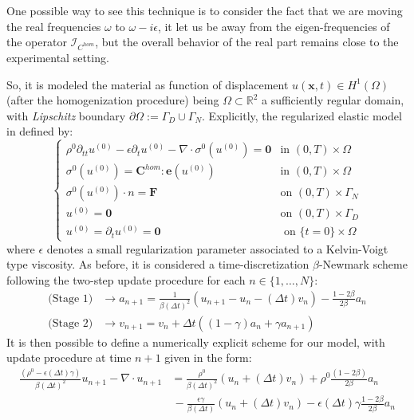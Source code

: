 \begin{rem}
One possible way to see this technique is to consider the fact that we are moving the real frequencies $\omega$ to $\omega - i\epsilon$, it let us be away from the eigen-frequencies of the operator $\mathcal{I}_{C^{hom}}$, but the overall behavior of the real part remains close to the experimental setting.
\end{rem}

So, it is modeled the material as function of displacement $u(\mathbf{x},t) \in H^{1}(\Omega)$ (after the homogenization procedure) being $\Omega \subset \mathbb{R}^2$ a sufficiently regular domain, with \textit{Lipschitz} boundary $\partial \Omega := \Gamma_D \cup \Gamma_N$. 
Explicitly, the regularized elastic model in defined by:
\begin{equation*}
    \left \{
    \begin{array}{cc}
        \rho^{0} \partial_{tt} u^{(0)} - \epsilon \partial_{t} u^{(0)} - \nabla \cdot \sigma^{0}(u^{(0)}) = \mathbf{0} & \text{in } (0,T)\times \Omega\\
        \sigma^{0}(u^{(0)}) =  \mathbf{C}^{hom}:\mathbf{e}(u^{(0)})  & \text{in }(0,T)\times \Omega\\ 
        \sigma^{0}(u^{(0)})\cdot n = \mathbf{F} & \text{on } (0,T)\times \Gamma_N\\
        u^{(0)} = \mathbf{0} & \text{on }(0,T)\times \Gamma_D \\
        u^{(0)} = \partial_t u^{(0)} = \mathbf{0}& \text{ on } \{t=0\}\times\Omega
    \end{array}
    \right .
\end{equation*}
where $\epsilon$ denotes a small regularization parameter associated to a Kelvin-Voigt type viscosity. 
As before, it is considered a time-discretization $\beta$-Newmark scheme following the two-step update procedure for each $n \in \{1,\dots, N\}$:
\begin{align*}
    \text{(Stage 1)} &\longrightarrow a_{n+1} = \frac{1}{\beta (\Delta t)^2} (u_{n+1}-u_{n}-(\Delta t)v_n) - \frac{1-2\beta}{2\beta}a_n\\
    \text{(Stage 2)}& \longrightarrow v_{n+1} = v_n + \Delta t((1-\gamma)a_n + \gamma a_{n+1})
\end{align*}
It is then possible to define a numerically explicit scheme for our model, with update procedure at time $n+1$ given in the form:
\begin{align*}
    \frac{(\rho^{0}- \epsilon (\Delta t) \gamma)}{\beta (\Delta t)^2} u_{n+1} - \nabla \cdot u_{n+1} &= \frac{\rho^{0}}{\beta (\Delta t)^2} (u_n + (\Delta t)v_n) + \rho^{0}\frac{ (1-2\beta)}{2\beta}a_n \\
    & \, - \frac{\epsilon \gamma}{\beta (\Delta t)}(u_n + (\Delta t)v_n) - \epsilon (\Delta t)\gamma\frac{1-2\beta}{2 \beta} a_n
\end{align*}

